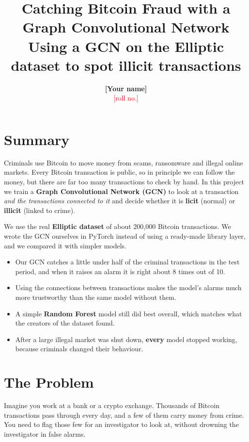 \documentclass[11pt,a4paper]{article}
\title{\vspace{-1.2cm}\textbf{Catching Bitcoin Fraud with a\\ Graph Convolutional Network}\\[4pt]
\large Using a GCN on the Elliptic dataset to spot illicit transactions}
\author{\textbf{[Your name]} \\ \textcolor{red}{[roll no.]}}
\date{}
\begin{document}
\maketitle
\thispagestyle{fancy}

\section*{Summary}
Criminals use Bitcoin to move money from scams, ransomware and illegal online markets. Every Bitcoin transaction is public,
so in principle we can follow the money, but there are far too many transactions to check by hand. In this project we
train a \textbf{Graph Convolutional Network (GCN)} to look at a transaction \emph{and the transactions connected to it} and decide
whether it is \textbf{licit} (normal) or \textbf{illicit} (linked to crime).

We use the real \textbf{Elliptic dataset} of about 200,000 Bitcoin transactions. We wrote the GCN ourselves in PyTorch instead of
using a ready-made library layer, and we compared it with simpler models.

\begin{itemize}
  \item Our GCN catches a little under half of the criminal transactions in the test period, and when it raises an alarm it is
        right about 8 times out of 10.
  \item Using the connections between transactions makes the model's alarms much more trustworthy than the same model without
        them.
  \item A simple \textbf{Random Forest} model still did best overall, which matches what the creators of the dataset found.
  \item After a large illegal market was shut down, \textbf{every} model stopped working, because criminals changed their behaviour.
\end{itemize}

\section{The Problem}
Imagine you work at a bank or a crypto exchange. Thousands of Bitcoin transactions pass through every day, and a few of
them carry money from crime. You need to flag those few for an investigator to look at, without drowning the investigator
in false alarms.
\end{document}
